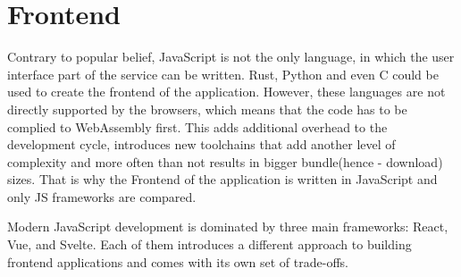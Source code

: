 \section{Frontend}
Contrary to popular belief, JavaScript is not the only language, in which the user interface part
of the service can be written. Rust, Python and even C could be used to create the frontend of the application.
However, these languages are not directly supported by the browsers, which
means that the code has to be complied to WebAssembly first. This adds
additional overhead to the development cycle, introduces new toolchains that add another level of
complexity and more often than not results in bigger bundle(hence - download) sizes.
That is why the Frontend of the application is written in JavaScript and only JS frameworks are
compared.

Modern JavaScript development is dominated by three main frameworks: React, Vue, and Svelte.\cite{webstats}
Each of them introduces a different approach to building frontend applications and comes with its own set of trade-offs.

